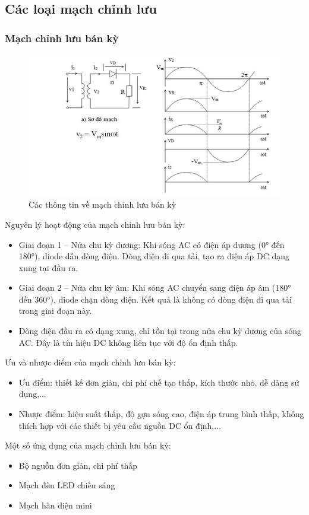 \documentclass[a4paper,15pt]{article}
\begin{document}
\subsection{Các loại mạch chỉnh lưu}
\subsubsection{Mạch chỉnh lưu bán kỳ}
\begin{figure}[H]
    \centering
    \includegraphics[scale=0.7]{img/sodomachbanky.PNG}
    \caption{Các thông tin về mạch chỉnh lưu bán kỳ}
    \label{fig:enter-label}
\end{figure}

Nguyên lý hoạt động của mạch chỉnh lưu bán kỳ:
\begin{itemize}
    \item Giai đoạn 1 – Nửa chu kỳ dương: Khi sóng AC có điện áp dương (0° đến 180°), diode dẫn dòng điện. Dòng điện đi qua tải, tạo ra điện áp DC dạng xung tại đầu ra.
    \item Giai đoạn 2 – Nửa chu kỳ âm: Khi sóng AC chuyển sang điện áp âm (180° đến 360°), diode chặn dòng điện. Kết quả là không có dòng điện đi qua tải trong giai đoạn này.
    \item Dòng điện đầu ra có dạng xung, chỉ tồn tại trong nửa chu kỳ dương của sóng AC. Đây là tín hiệu DC không liên tục với độ ổn định thấp.
\end{itemize}
Ưu và nhược điểm của mạch chỉnh lưu bán kỳ:
\begin{itemize}
    \item Ưu điểm: thiết kế đơn giản, chi phí chế tạo thấp, kích thước nhỏ, dễ dàng sử dụng,...
    \item Nhược điểm: hiệu suất thấp, độ gợn sóng cao, điện áp trung bình thấp, không thích hợp với các thiết bị yêu cầu nguồn DC ổn định,...
\end{itemize}
Một số ứng dụng của mạch chỉnh lưu bán kỳ:
\begin{itemize}
    \item Bộ nguồn đơn giản, chi phí thấp
    \item  Mạch đèn LED chiếu sáng
    \item Mạch hàn điện mini
\end{itemize}
\newpage
\end{document}
